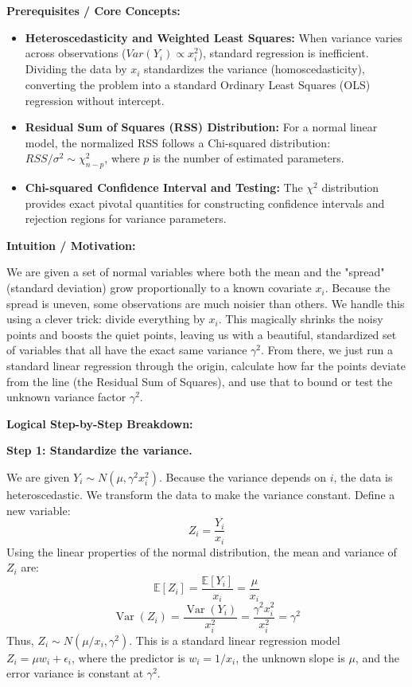 \begin{solution}
\textbf{Prerequisites / Core Concepts:}
\begin{itemize}
    \item \textbf{Heteroscedasticity and Weighted Least Squares:} When variance varies across observations ($Var(Y_i) \propto x_i^2$), standard regression is inefficient. Dividing the data by $x_i$ standardizes the variance (homoscedasticity), converting the problem into a standard Ordinary Least Squares (OLS) regression without intercept.
    \item \textbf{Residual Sum of Squares (RSS) Distribution:} For a normal linear model, the normalized RSS follows a Chi-squared distribution: $RSS/\sigma^2 \sim \chi^2_{n-p}$, where $p$ is the number of estimated parameters.
    \item \textbf{Chi-squared Confidence Interval and Testing:} The $\chi^2$ distribution provides exact pivotal quantities for constructing confidence intervals and rejection regions for variance parameters.
\end{itemize}

\textbf{Intuition / Motivation:}

We are given a set of normal variables where both the mean and the "spread" (standard deviation) grow proportionally to a known covariate $x_i$. Because the spread is uneven, some observations are much noisier than others. We handle this using a clever trick: divide everything by $x_i$. This magically shrinks the noisy points and boosts the quiet points, leaving us with a beautiful, standardized set of variables that all have the exact same variance $\gamma^2$. From there, we just run a standard linear regression through the origin, calculate how far the points deviate from the line (the Residual Sum of Squares), and use that to bound or test the unknown variance factor $\gamma^2$.

\textbf{Logical Step-by-Step Breakdown:}

\textbf{Step 1: Standardize the variance.}

We are given $Y_i \sim N(\mu, \gamma^2 x_i^2)$. Because the variance depends on $i$, the data is heteroscedastic.
We transform the data to make the variance constant. Define a new variable:
\[ Z_i = \frac{Y_i}{x_i} \]
Using the linear properties of the normal distribution, the mean and variance of $Z_i$ are:
\[ \mathbb{E}[Z_i] = \frac{\mathbb{E}[Y_i]}{x_i} = \frac{\mu}{x_i} \]
\[ \operatorname{Var}(Z_i) = \frac{\operatorname{Var}(Y_i)}{x_i^2} = \frac{\gamma^2 x_i^2}{x_i^2} = \gamma^2 \]
Thus, $Z_i \sim N(\mu/x_i, \gamma^2)$. This is a standard linear regression model $Z_i = \mu w_i + \epsilon_i$, where the predictor is $w_i = 1/x_i$, the unknown slope is $\mu$, and the error variance is constant at $\gamma^2$.


\end{solution}
